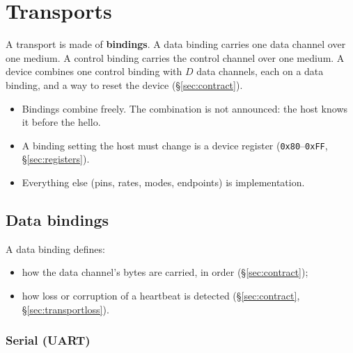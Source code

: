 \documentclass[11pt,a4paper]{article}
\newcommand{\sref}[1]{\S\ref{#1}}
\newcommand{\hex}[1]{\texttt{#1}}
\begin{document}
\section{Transports}\label{sec:transports}

A transport is made of \textbf{bindings}. A data binding carries one data channel over
one medium. A control binding carries the control channel over one medium. A device
combines one control binding with $D$ data channels, each on a data binding, and a way
to reset the device (\sref{sec:contract}).

\begin{itemize}
  \item Bindings combine freely. The combination is not announced: the host knows it
        before the hello.
  \item A binding setting the host must change is a device register
        (\hex{0x80}--\hex{0xFF}, \sref{sec:registers}).
  \item Everything else (pins, rates, modes, endpoints) is implementation.
\end{itemize}

\subsection{Data bindings}\label{sec:databindings}

A data binding defines:
\begin{itemize}
  \item how the data channel's bytes are carried, in order (\sref{sec:contract});
  \item how loss or corruption of a heartbeat is detected (\sref{sec:contract},
        \sref{sec:transportloss}).
\end{itemize}

\subsubsection{Serial (UART)}\label{sec:serial}
\end{document}
